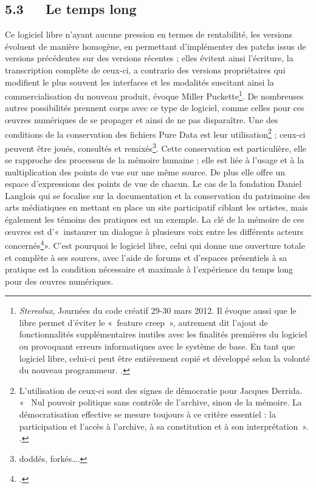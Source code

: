 \documentclass{FramateX}
\begin{document}
\begin{refsection}
\subsection*{5.3~~~Le temps long}
{}

Ce logiciel libre n'ayant aucune pression en termes de
rentabilité, les versions évoluent de manière homogène, en permettant
d'implémenter des patchs issus de versions précédentes sur des versions
récentes ; elles évitent ainsi l'écriture, la transcription complète de
ceux-ci, a contrario des versions propriétaires qui modifient le plus
souvent les interfaces et les modalités suscitant ainsi la
commercialisation du nouveau produit, évoque Miller
Puckette\footnote{\textit{Stereolux}, Journées du code créatif 29-30 mars
2012. Il évoque aussi que le libre permet d'éviter
le «~feature creep~», autrement dit l'ajout de
fonctionnalités supplémentaires inutiles avec les finalités premières
du logiciel ou provoquant erreurs informatiques avec le système de
base. En tant que logiciel libre, celui-ci peut être entièrement copié
et développé selon la volonté du nouveau programmeur. \cite[p.~188]{Puckette2011}.}. De nombreuses
autres possibilités prennent corps avec ce type de logiciel, comme
celles pour ces œuvres numériques de se propager et ainsi de ne pas
disparaître. Une des conditions de la conservation des fichiers Pure
Data est leur utilisation\footnote{L'utilisation de ceux-ci sont des
signes de démocratie pour Jacques Derrida. «~ Nul pouvoir politique
sans contrôle de l'archive, sinon de la mémoire. La
démocratisation effective se mesure toujours à ce critère essentiel :
la participation et l'accès à l'archive, à sa constitution et à son interprétation~». \cite[p.~15]{Derrida1995}.} ; ceux-ci peuvent être joués, consultés et
remixés\footnote{doddés, forkés….}. Cette conservation est
particulière, elle se rapproche des processus de la mémoire humaine ;
elle est liée à l'usage et à la multiplication des points de vue sur
une même source. De plus elle offre un espace d'expressions des points
de vue de chacun. Le cas de la fondation Daniel Langlois qui se
focalise sur la documentation et la conservation du patrimoine des arts
médiatiques en mettant en place un site participatif ciblant les
artistes, mais également les témoins des pratiques est un exemple. La
clé de la mémoire de ces œuvres est d'«~instaurer un dialogue à
plusieurs voix entre les différents acteurs concernés\footnote{\cite[p.~161]{LaForet2011}.}». C'est pourquoi le logiciel libre, celui qui donne une ouverture totale et complète à ses sources, avec l'aide de forums et d'espaces présentiels
à sa pratique est la condition nécessaire et maximale à l'expérience du
temps long pour des œuvres numériques.


\end{refsection}
\end{document}
